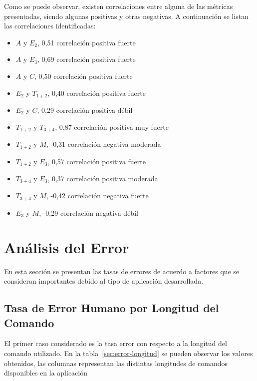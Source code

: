 Como se puede observar, existen correlaciones entre alguna de las m\'etricas presentadas, 
siendo algunas positivas y otras negativas. A continuaci\'on se listan las correlaciones identificadas:

\begin{itemize}
    \item $A$ y $E_2$, 0,51 correlaci\'on positiva fuerte
    \item $A$ y $E_3$, 0,69 correlaci\'on positiva fuerte
    \item $A$ y $C$, 0,50 correlaci\'on positiva fuerte 
    \item $E_2$ y $T_{1+2}$, 0,40 correlaci\'on positiva fuerte
    \item $E_2$ y $C$, 0,29 correlaci\'on positiva d\'ebil
    \item $T_{1+2}$ y $T_{3+4}$, 0,87 correlaci\'on positiva muy fuerte
    \item $T_{1+2}$ y $M$, -0,31 correlaci\'on negativa moderada
    \item $T_{1+2}$ y $E_3$, 0,57 correlaci\'on positiva fuerte
    \item $T_{3+4}$ y $E_3$, 0,37 correlaci\'on positiva moderada
    \item $T_{3+4}$ y $M$, -0,42 correlaci\'on negativa fuerte
    \item $E_3$ y $M$, -0,29 correlaci\'on negativa d\'ebil
\end{itemize}


\section{An\'alisis del Error}

En esta secci\'on se presentan las tasas de errores de acuerdo a factores que se consideran importantes debido
al tipo de aplicaci\'on desarrollada. 

\subsection{Tasa de Error Humano por Longitud del Comando}
El primer caso considerado es la tasa error con respecto a la longitud del comando
utilizado. En la tabla~\ref{sec:error-longitud} se pueden observar los valores obtenidos, las columnas
representan las distintas longitudes de comandos disponibles en la aplicaci\'on

